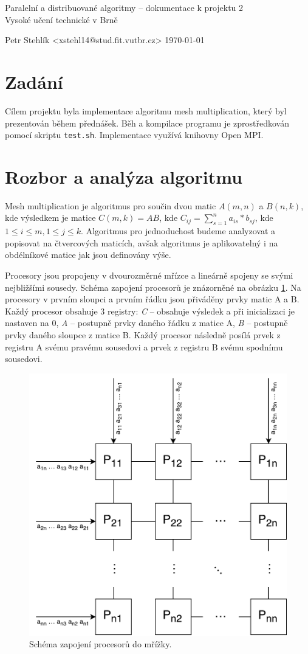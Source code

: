 \documentclass[11pt,a4paper]{article}
\begin{document}
\begin{center}
	\LARGE{Paralelní a distribuované algoritmy -- dokumentace k projektu 2}\\
	\large{Vysoké učení technické v Brně}
	\vspace{0.2cm}

	Petr Stehlík <xstehl14@stud.fit.vutbr.cz>     \today

\end{center}

\section{Zadání}

Cílem projektu byla implementace algoritmu mesh multiplication, který byl prezentován během přednášek. Běh a kompilace programu je zprostředkován pomocí skriptu \texttt{test.sh}. Implementace využívá knihovny Open MPI.

\section{Rozbor a analýza algoritmu}

Mesh multiplication je algoritmus pro součin dvou matic $A(m,n)$ a $B(n,k)$, kde výsledkem je matice $C (m,k) = AB$, kde $C_{ij} = \sum\limits_{s=1}^n a_{is} * b_{sj}$, kde $1 \leq i \leq m, 1 \leq j \leq k$. Algoritmus pro jednoduchost budeme analyzovat a popisovat na čtvercových maticích, avšak algoritmus je aplikovatelný i na obdélníkové matice jak jsou definovány výše.

Procesory jsou propojeny v dvourozměrné mřízce a lineárně spojeny se svými nejbližšími sousedy. Schéma zapojení procesorů je znázorněné na obrázku \ref{schema}. Na procesory v prvním sloupci a prvním řádku jsou přiváděny prvky matic A a B. Každý procesor obsahuje 3 registry: \textit{C} -- obsahuje výsledek a při inicializaci je nastaven na $0$, \textit{A} -- postupně prvky daného řádku z matice A, \textit{B} -- postupně prvky daného sloupce z matice B. Každý procesor následně posílá prvek z registru A svému pravému sousedovi a prvek z registru B svému spodnímu sousedovi.

\begin{figure}[h]
    \includegraphics[width=0.5\linewidth]{mesh}
    \centering
	\caption{Schéma zapojení procesorů do mřížky.}
    \label{schema}
\end{figure}
\end{document}
